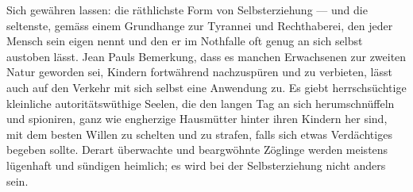 Sich gewähren lassen: die räthlichste Form von Selbsterziehung — und die seltenste, gemäss einem Grundhange zur Tyrannei und Rechthaberei, den jeder Mensch sein eigen nennt und den er im Nothfalle oft genug an sich selbst austoben lässt. Jean Pauls Bemerkung, dass es manchen Erwachsenen zur zweiten Natur geworden sei, Kindern fortwährend nachzuspüren und zu verbieten, lässt auch auf den Verkehr mit sich selbst eine Anwendung zu. Es giebt herrschsüchtige kleinliche autoritätswüthige Seelen, die den langen Tag an sich herumschnüffeln und spioniren, ganz wie engherzige Hausmütter hinter ihren Kindern her sind, mit dem besten Willen zu schelten und zu strafen, falls sich etwas Verdächtiges begeben sollte. Derart überwachte und beargwöhnte Zöglinge werden meistens lügenhaft und sündigen heimlich; es wird bei der Selbsterziehung nicht anders sein.
\par

